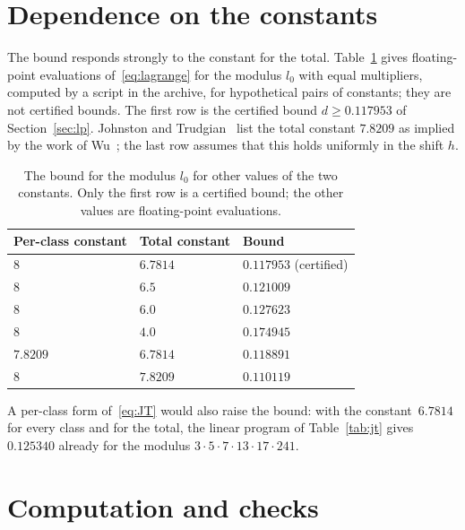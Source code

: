 \documentclass[11pt]{amsart}
\theoremstyle{definition}
\theoremstyle{remark}
\numberwithin{equation}{section}
\newcommand{\Dcw}{0.117953}
\newcommand{\Lich}{6.7814}
\begin{document}
\section{Dependence on the constants}\label{sec:dep}

The bound responds strongly to the constant for the total. Table~\ref{tab:dep} gives floating-point evaluations of~\eqref{eq:lagrange} for the modulus $l_0$ with equal multipliers, computed by a script in the archive, for hypothetical pairs of constants; they are not certified bounds. The first row is the certified bound $d\ge\Dcw$ of Section~\ref{sec:lp}. Johnston and Trudgian~\cite[Table~2]{JT26} list the total constant $7.8209$ as implied by the work of Wu~\cite{Wu04}; the last row assumes that this holds uniformly in the shift $h$.

\begin{table}[ht]
\centering
\small
\caption{The bound for the modulus $l_0$ for other values of the two constants. Only the first row is a certified bound; the other values are floating-point evaluations.}\label{tab:dep}
\begin{tabular}{@{}lll@{}}
\toprule
Per-class constant & Total constant & Bound\\
\midrule
$8$ & $\Lich$ & $\Dcw$ (certified)\\
$8$ & $6.5$ & $0.121009$\\
$8$ & $6.0$ & $0.127623$\\
$8$ & $4.0$ & $0.174945$\\
$7.8209$ & $\Lich$ & $0.118891$\\
$8$ & $7.8209$ & $0.110119$\\
\bottomrule
\end{tabular}
\end{table}

A per-class form of~\eqref{eq:JT} would also raise the bound: with the constant~$\Lich$ for every class and for the total, the linear program of Table~\ref{tab:jt} gives $0.125340$ already for the modulus $3\cdot5\cdot7\cdot13\cdot17\cdot241$.

\appendix
\section{Computation and checks}\label{sec:check}
\end{document}
